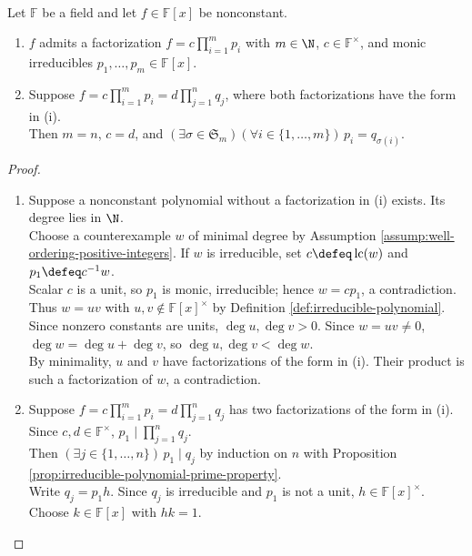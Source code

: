 \begin{theorem} \label{thm:unique-factorization-polynomial-ring-field} \\
Let $\mathbb{F}$ be a field and let $f\in\mathbb{F}[x]$ be nonconstant.
\begin{enumerate}[label=(\roman*)]
\setlength{\itemsep}{0pt}
\item $f$ admits a factorization $f=c\prod\limits_{i=1}^{m}p_i$ with $m\in\N$, $c\in\mathbb{F}^\times$, and monic irreducibles $p_1,\ldots,p_m\in\mathbb{F}[x]$.
\item Suppose $f=c\prod\limits_{i=1}^{m}p_i=d\prod\limits_{j=1}^{n}q_j$, where both factorizations have the form in (i).\\
Then $m=n$, $c=d$, and $(\exists \sigma\in\mathfrak{S}_m)(\forall i\in\{1,\ldots,m\})\,p_i=q_{\sigma(i)}$.
\end{enumerate}
\begin{proof}
\begin{enumerate}[label=(\roman*)]
\setlength{\itemsep}{0pt}
\item Suppose a nonconstant polynomial without a factorization in (i) exists. Its degree lies in $\N$.\\
Choose a counterexample $w$ of minimal degree by Assumption \ref{assump:well-ordering-positive-integers}. If $w$ is irreducible, set $c\defeq\operatorname{lc}(w)$ and $p_1\defeq c^{-1}w$.\\
Scalar $c$ is a unit, so $p_1$ is monic, irreducible; hence $w=cp_1$, a contradiction. Thus $w=uv$ with $u,v\notin\mathbb{F}[x]^\times$ by Definition \ref{def:irreducible-polynomial}.\\
Since nonzero constants are units, $\deg u,\deg v>0$. Since $w=uv\neq0$, $\deg w=\deg u+\deg v$, so $\deg u,\deg v<\deg w$.\\
By minimality, $u$ and $v$ have factorizations of the form in (i). Their product is such a factorization of $w$, a contradiction.
\item Suppose $f=c\prod\limits_{i=1}^{m}p_i=d\prod\limits_{j=1}^{n}q_j$ has two factorizations of the form in (i). Since $c,d\in\mathbb{F}^\times$, $p_1\mid\prod\limits_{j=1}^{n}q_j$.\\
Then $(\exists j\in\{1,\ldots,n\})\,p_1\mid q_j$ by induction on $n$ with Proposition \ref{prop:irreducible-polynomial-prime-property}.\\
Write $q_j=p_1h$. Since $q_j$ is irreducible and $p_1$ is not a unit, $h\in\mathbb{F}[x]^\times$. Choose $k\in\mathbb{F}[x]$ with $hk=1$.\\

\end{enumerate}
\end{proof}
\end{theorem}
